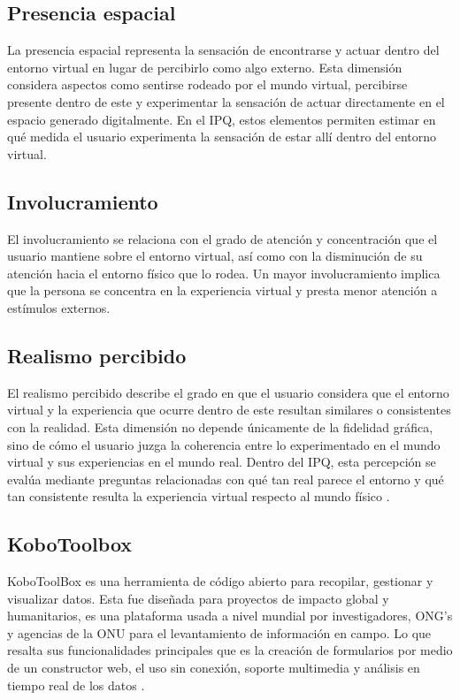 \subsection{Presencia espacial}
La presencia espacial representa la sensación de encontrarse y actuar dentro del entorno virtual en lugar de percibirlo como algo externo. Esta dimensión considera aspectos como sentirse rodeado por el mundo virtual, percibirse presente dentro de este y experimentar la sensación de actuar directamente en el espacio generado digitalmente. En el IPQ, estos elementos permiten estimar en qué medida el usuario experimenta la sensación de estar allí dentro del entorno virtual.
\subsection{Involucramiento}
El involucramiento se relaciona con el grado de atención y concentración que el usuario mantiene sobre el entorno virtual, así como con la disminución de su atención hacia el entorno físico que lo rodea. Un mayor involucramiento implica que la persona se concentra en la experiencia virtual y presta menor atención a estímulos externos.
\subsection{Realismo percibido}
El realismo percibido describe el grado en que el usuario considera que el entorno virtual y la experiencia que ocurre dentro de este resultan similares o consistentes con la realidad. Esta dimensión no depende únicamente de la fidelidad gráfica, sino de cómo el usuario juzga la coherencia entre lo experimentado en el mundo virtual y sus experiencias en el mundo real. Dentro del IPQ, esta percepción se evalúa mediante preguntas relacionadas con qué tan real parece el entorno y qué tan consistente resulta la experiencia virtual respecto al mundo físico \cite{berkman2021igroup,castro2026immersive}.
\subsection{KoboToolbox}
KoboToolBox es una herramienta de código abierto para recopilar, gestionar y visualizar datos. Esta fue diseñada para proyectos de impacto global y humanitarios, es una plataforma usada a nivel mundial por investigadores, ONG’s y agencias de la ONU para el levantamiento de información en campo. Lo que resalta sus funcionalidades principales que es la creación de formularios por medio de un constructor web, el uso sin conexión, soporte multimedia y análisis en tiempo real de los datos \cite{kobo}. 
